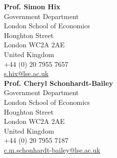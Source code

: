 \documentclass[a4paper]{article}
\begin{document}
\noindent \textbf{Prof. Simon Hix}\\
Government Department \\
London School of Economics \\
Houghton Street \\
London WC2A 2AE \\
United Kingdom\\
+44 (0) 20 7955 7657\\
\href{mailto:s.hix@lse.ac.uk}{s.hix@lse.ac.uk}\\

\noindent \textbf{Prof. Cheryl Schonhardt-Bailey}\\
Government Department \\
London School of Economics \\
Houghton Street \\
London WC2A 2AE \\
United Kingdom\\
+44 (0) 20 7955 7187\\
\href{mailto:c.m.schonhardt-bailey@lse.ac.uk}{c.m.schonhardt-bailey@lse.ac.uk}\\
\end{document}
